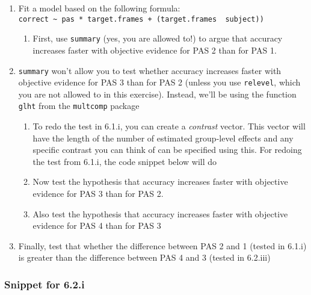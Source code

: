 \documentclass[
]{article}
\providecommand{\tightlist}{%
  \setlength{\itemsep}{0pt}\setlength{\parskip}{0pt}}
\begin{document}
\begin{enumerate}
\def\labelenumi{\arabic{enumi})}
\tightlist
\item
  Fit a model based on the following formula:
  \texttt{correct\ \textasciitilde{}\ pas\ *\ target.frames\ +\ (target.frames\ \textbar{}\ subject))}

  \begin{enumerate}
  \def\labelenumii{\roman{enumii}.}
  \tightlist
  \item
    First, use \texttt{summary} (yes, you are allowed to!) to argue that
    accuracy increases faster with objective evidence for PAS 2 than for
    PAS 1.
  \end{enumerate}
\item
  \texttt{summary} won't allow you to test whether accuracy increases
  faster with objective evidence for PAS 3 than for PAS 2 (unless you
  use \texttt{relevel}, which you are not allowed to in this exercise).
  Instead, we'll be using the function \texttt{glht} from the
  \texttt{multcomp} package

  \begin{enumerate}
  \def\labelenumii{\roman{enumii}.}
  \tightlist
  \item
    To redo the test in 6.1.i, you can create a \emph{contrast} vector.
    This vector will have the length of the number of estimated
    group-level effects and any specific contrast you can think of can
    be specified using this. For redoing the test from 6.1.i, the code
    snippet below will do
  \item
    Now test the hypothesis that accuracy increases faster with
    objective evidence for PAS 3 than for PAS 2.
  \item
    Also test the hypothesis that accuracy increases faster with
    objective evidence for PAS 4 than for PAS 3
  \end{enumerate}
\item
  Finally, test that whether the difference between PAS 2 and 1 (tested
  in 6.1.i) is greater than the difference between PAS 4 and 3 (tested
  in 6.2.iii)
\end{enumerate}

\hypertarget{snippet-for-6.2.i}{%
\subsubsection{Snippet for 6.2.i}\label{snippet-for-6.2.i}}
\end{document}
